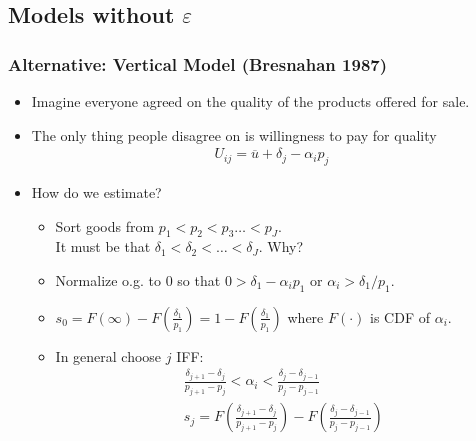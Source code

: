 \documentclass[xcolor=pdftex,dvipsnames,table,mathserif,aspectratio=169]{beamer}
\begin{document}
\subsection*{Models without $\varepsilon$}


\begin{frame}
\frametitle{Alternative: Vertical Model (Bresnahan 1987)}
\footnotesize
\begin{itemize}
\item Imagine everyone agreed on the quality of the products offered for sale.
\item The only thing people disagree on is willingness to pay for quality
\begin{eqnarray*}
U_{ij} = \overline{u} + \delta_j - \alpha_i p_j
\end{eqnarray*}
\item How do we estimate?
\begin{itemize}
\item Sort goods from $p_1 < p_2  < p_3 \ldots < p_J$.\\
 It must be that $\delta_1 < \delta_2 < \ldots < \delta_J$. Why?
 \item Normalize o.g. to $0$ so that $ 0 > \delta_1 -\alpha_i p_1$ or $\alpha_i > \delta_1 / p_1$.
 \item $s_0 = F(\infty) - F(\frac{\delta_1}{p_1})  = 1 - F(\frac{\delta_1}{p_1}) $ where $F(\cdot)$ is CDF of $\alpha_i$.
 \item In general choose $j$ IFF:
 \begin{eqnarray*}
 \frac{\delta_{j+1} - \delta_j}{p_{j+1} -p_j} < \alpha_i < \frac{\delta_j  - \delta_{j-1}}{p_j - p_{j-1}}\\
 s_j = F\left(\frac{\delta_{j+1} - \delta_j}{p_{j+1} -p_j} \right) - F\left(\frac{\delta_j  - \delta_{j-1}}{p_j - p_{j-1}} \right)
 \end{eqnarray*}
\end{itemize}
\end{itemize}
\end{frame}
\end{document}
